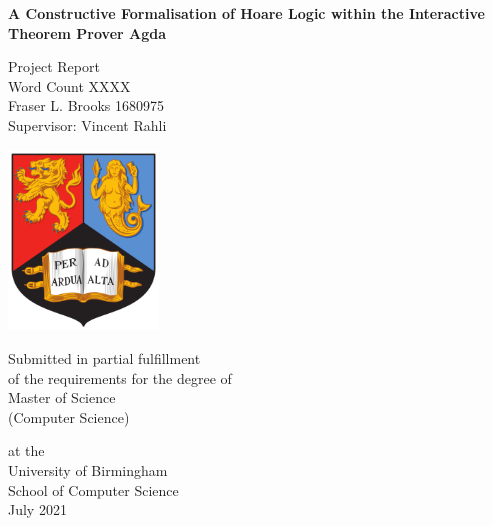 \documentclass[oneside,12pt]{article}
\begin{document}
\begin{titlepage}
  \begin{center}
    \large

    \textbf{\Large A Constructive Formalisation of Hoare Logic within the Interactive Theorem Prover Agda}

    
    \vfill

    Project Report \\
    Word Count XXXX   \\
    Fraser L. Brooks 1680975 \\
    Supervisor: Vincent Rahli
    
    \vfill
    \includegraphics[width=4cm]{Figures/birmingham_shield.png}
    \vfill
       
    Submitted in partial fulfillment \\
    of the requirements for the degree of\\
    Master of Science \\
    (Computer Science) \\
       
    \vfill
       
    at the \\
    University of Birmingham\\
    School of Computer Science\\
    July 2021
       
    \vspace{0.8cm}
       
  \end{center}
\end{titlepage}

\flushbottom
\end{document}
